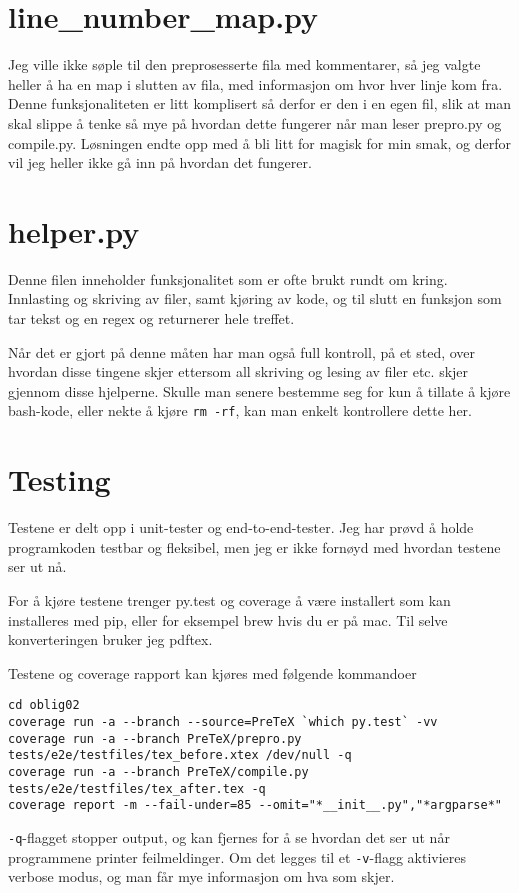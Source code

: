 \documentclass{article}
\newcommand{\code}[1]{\colorbox{codegray}{\texttt{#1}}}
\begin{document}
\section{line\_number\_map.py}
Jeg ville ikke søple til den preprosesserte fila med kommentarer, så jeg
valgte heller å ha en map i slutten av fila, med informasjon om hvor hver
linje kom fra. Denne funksjonaliteten er litt komplisert så derfor er den
i en egen fil, slik at man skal slippe å tenke så mye på hvordan dette fungerer
når man leser prepro.py og compile.py. Løsningen endte opp med å bli
litt for magisk for min smak, og derfor vil jeg heller ikke gå inn på hvordan
det fungerer.

\section{helper.py}
Denne filen inneholder funksjonalitet som er ofte brukt rundt om kring.
Innlasting og skriving av filer, samt kjøring av kode, og til slutt
en funksjon som tar tekst og en regex og returnerer hele treffet.

Når det er gjort på denne måten har man også full kontroll, på et sted, over
hvordan disse tingene skjer ettersom all skriving og lesing av filer etc.
skjer gjennom disse hjelperne. Skulle man senere bestemme seg for kun å
tillate å kjøre bash-kode, eller nekte å kjøre \code{rm -rf},
kan man enkelt kontrollere dette her.

\section{Testing}
Testene er delt opp i unit-tester og end-to-end-tester. Jeg har prøvd å holde
programkoden testbar og fleksibel, men jeg er ikke fornøyd med hvordan testene
ser ut nå.

For å kjøre testene trenger py.test og coverage å være installert som kan
installeres med pip, eller for eksempel brew hvis du er på mac.
Til selve konverteringen bruker jeg pdftex.

Testene og coverage rapport kan kjøres med følgende kommandoer
\begin{Verbatim}[numbers=none,frame=lines,label=\fbox{{\tiny Terminal}},fontsize=\fontsize{9pt}{9pt},
labelposition=topline,framesep=2.5mm,framerule=0.7pt]
cd oblig02
coverage run -a --branch --source=PreTeX `which py.test` -vv
coverage run -a --branch PreTeX/prepro.py tests/e2e/testfiles/tex_before.xtex /dev/null -q
coverage run -a --branch PreTeX/compile.py tests/e2e/testfiles/tex_after.tex -q
coverage report -m --fail-under=85 --omit="*__init__.py","*argparse*"
\end{Verbatim}
\noindent
\code{-q}-flagget stopper output, og kan fjernes for å se hvordan det ser ut
når programmene printer feilmeldinger. Om det legges til et \code{-v}-flagg
aktivieres verbose modus, og man får mye informasjon om hva som skjer.
\end{document}
